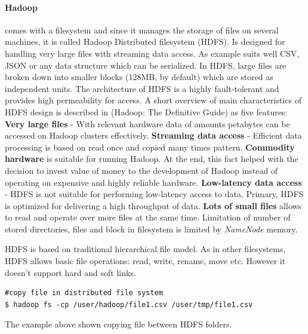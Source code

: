 \documentclass[a4paper,12pt,oneside]{report}
\begin{document}
	\paragraph*{Hadoop} comes with a filesystem and since it manages the storage of
	files on several 
	machines, it is called Hadoop Distributed filesystem (HDFS). Is designed for
	handling very large files with streaming
	data access. As example suits well CSV, JSON or any data structure which can be
	serialized. \cite{hadoop_hdfs_web} In HDFS, large files are broken down into
	smaller blocks (128MB, by default) which are 
	stored as independent units. The architecture of HDFS is a highly fault-tolerant
	and provides high permeability for access.   
	A short overview of main characteristics of HDFS design is described in
	(Hadoop: The Definitive 
	Guide\cite{hadoop_definitive}) as five features: \textbf{Very large files} -
	With relevant hardware data of amounts petabytes 
	can be accessed on Hadoop clusters effectively. \textbf{Streaming data access} -
	Efficient data processing is based on
	read once and copied many times pattern. \textbf{Commodity hardware} is
	suitable for running Hadoop. At the end,
	this fact helped with the decision to invest value of money to the development
	of Hadoop instead 
	of operating on expensive and highly reliable hardware. \textbf{Low-latency
		data access} - HDFS is not suitable for performing
	low-latency access to data. Primary, HDFS is optimized for delivering
	a high throughput of data. \textbf{Lots of small files} allows to read and
	operate over more files
	at the same time. Limitation of number of stored directories,  files and block
	in filesystem is limited by \emph{NameNode} memory.
	
	HDFS is based on traditional hierarchical file model. As in other filesystems,
	HDFS allows basic file operations: 
	read, write, rename, move etc. However it doesn’t support hard and soft links. 
	
	\begin{footnotesize}
		\begin{lstlisting}[style=mybash]
#copy file in distributed file system
$ hadoop fs -cp /user/hadoop/file1.csv /user/tmp/file1.csv 
		\end{lstlisting}
	\end{footnotesize} 
	The example above shown copying file between HDFS folders. 
	
	
\end{document}
